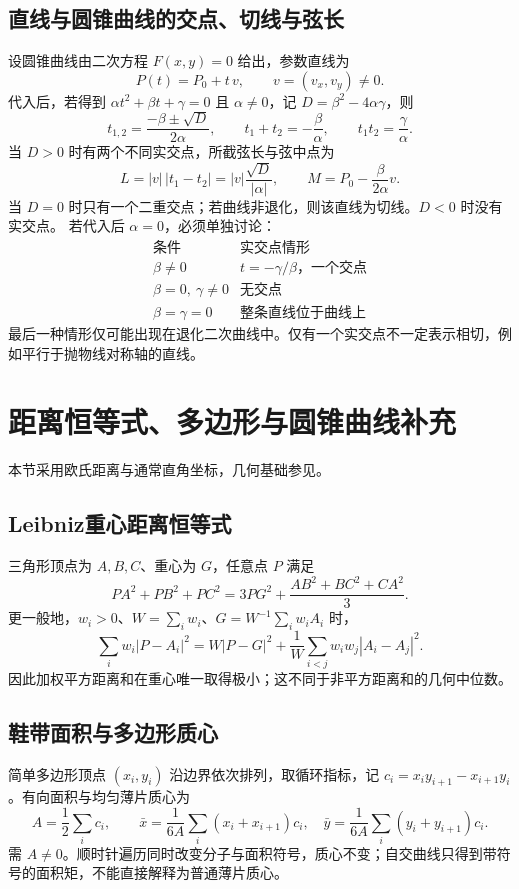 \documentclass[../main.tex]{subfiles}
\begin{document}
\subsection{直线与圆锥曲线的交点、切线与弦长}
设圆锥曲线由二次方程 $F(x,y)=0$ 给出，参数直线为
\[
P(t)=P_0+t\,v,\qquad v=(v_x,v_y)\ne0.
\]
代入后，若得到 $\alpha t^2+\beta t+\gamma=0$ 且 $\alpha\ne0$，记 $D=\beta^2-4\alpha\gamma$，则
\[
t_{1,2}=\frac{-\beta\pm\sqrt D}{2\alpha},\qquad
t_1+t_2=-\frac\beta\alpha,\qquad t_1t_2=\frac\gamma\alpha.
\]
当 $D>0$ 时有两个不同实交点，所截弦长与弦中点为
\[
L=|v|\,|t_1-t_2|=|v|\frac{\sqrt D}{|\alpha|},\qquad
M=P_0-\frac{\beta}{2\alpha}v.
\]
当 $D=0$ 时只有一个二重交点；若曲线非退化，则该直线为切线。$D<0$ 时没有实交点。
若代入后 $\alpha=0$，必须单独讨论：
\[
\begin{array}{c|c}
\text{条件}&\text{实交点情形}\\\hline
\beta\ne0&t=-\gamma/\beta\text{，一个交点}\\
\beta=0,\ \gamma\ne0&\text{无交点}\\
\beta=\gamma=0&\text{整条直线位于曲线上}
\end{array}
\]
最后一种情形仅可能出现在退化二次曲线中。仅有一个实交点不一定表示相切，例如平行于抛物线对称轴的直线。
\section{距离恒等式、多边形与圆锥曲线补充}
本节采用欧氏距离与通常直角坐标，几何基础参见\cite{euclid,geometry}。
\subsection{Leibniz重心距离恒等式}
三角形顶点为 $A,B,C$、重心为 $G$，任意点 $P$ 满足
\[
PA^2+PB^2+PC^2=3PG^2+\frac{AB^2+BC^2+CA^2}{3}.
\]
更一般地，$w_i>0$、$W=\sum_iw_i$、$G=W^{-1}\sum_iw_iA_i$ 时，
\[
\sum_iw_i|P-A_i|^2=W|P-G|^2+
\frac1W\sum_{i<j}w_iw_j|A_i-A_j|^2.
\]
因此加权平方距离和在重心唯一取得极小；这不同于非平方距离和的几何中位数。
\subsection{鞋带面积与多边形质心}
简单多边形顶点 $(x_i,y_i)$ 沿边界依次排列，取循环指标，记 $c_i=x_iy_{i+1}-x_{i+1}y_i$。有向面积与均匀薄片质心为
\[
A=\frac12\sum_i c_i,\qquad
\bar x=\frac1{6A}\sum_i(x_i+x_{i+1})c_i,\quad
\bar y=\frac1{6A}\sum_i(y_i+y_{i+1})c_i.
\]
需 $A\ne0$。顺时针遍历同时改变分子与面积符号，质心不变；自交曲线只得到带符号的面积矩，不能直接解释为普通薄片质心。
\end{document}
